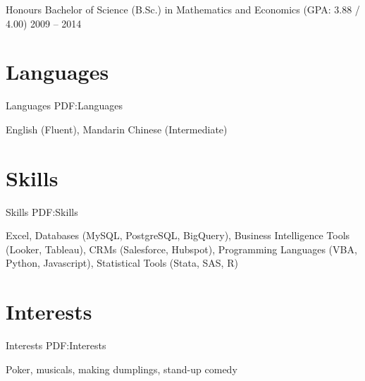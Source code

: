 \documentclass[letterpaper,10pt,oneside]{article}
\begin{document}
\begin{body}
\GapNoBreak
\BulletItem
Honours Bachelor of Science (B.Sc.) in Mathematics and Economics (GPA: 3.88 / 4.00)
\hfill
2009 -- 2014


\section
{Languages}
{Languages}
{PDF:Languages}

English (Fluent), Mandarin Chinese (Intermediate)


\section
{Skills}
{Skills}
{PDF:Skills}

Excel, Databases (MySQL, PostgreSQL, BigQuery), Business Intelligence Tools (Looker, Tableau), CRMs (Salesforce, Hubspot), Programming Languages (VBA, Python, Javascript), Statistical Tools (Stata, SAS, R)


\section
{Interests}
{Interests}
{PDF:Interests}

Poker, musicals, making dumplings, stand-up comedy

\end{body}
\end{document}
